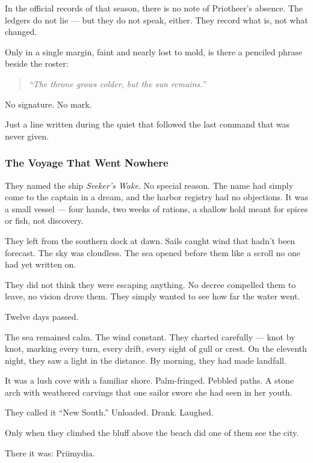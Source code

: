 \documentclass[12pt]{article}
\begin{document}
In the official records of that season, there is no note of Priotheer’s absence. The ledgers do not lie — but they do not speak, either. They record what is, not what changed.

Only in a single margin, faint and nearly lost to mold, is there a penciled phrase beside the roster:

\begin{quote}
\emph{“The throne grows colder, but the sun remains.”}
\end{quote}

No signature. No mark.

Just a line written during the quiet that followed the last command that was never given.

\dotfill

\subsubsection*{The Voyage That Went Nowhere}

They named the ship \emph{Seeker’s Wake}. No special reason. The name had simply come to the captain in a dream, and the harbor registry had no objections. It was a small vessel — four hands, two weeks of rations, a shallow hold meant for spices or fish, not discovery.

They left from the southern dock at dawn. Sails caught wind that hadn’t been forecast. The sky was cloudless. The sea opened before them like a scroll no one had yet written on.

They did not think they were escaping anything. No decree compelled them to leave, no vision drove them. They simply wanted to see how far the water went.

Twelve days passed.

The sea remained calm. The wind constant. They charted carefully — knot by knot, marking every turn, every drift, every sight of gull or crest. On the eleventh night, they saw a light in the distance. By morning, they had made landfall.

It was a lush cove with a familiar shore. Palm-fringed. Pebbled paths. A stone arch with weathered carvings that one sailor swore she had seen in her youth.

They called it ``New South.'' Unloaded. Drank. Laughed.

Only when they climbed the bluff above the beach did one of them see the city.

There it was: Priimydia.
\end{document}
